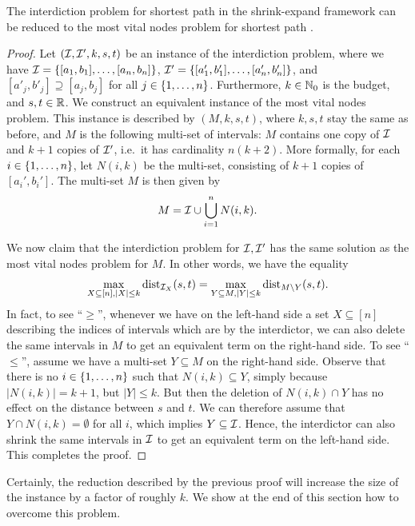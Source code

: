 \begin{lemma}
\label{lemma:shortest_path_reduction}
The interdiction problem for shortest path in the shrink-expand framework can be reduced to the most vital nodes problem for shortest path .
\end{lemma}
\begin{proof} 
Let $(\mathcal{I}, \mathcal{I}', k, s,t)$ be an instance of the interdiction problem, where we have $\mathcal{I} = \{ [a_1, b_1], \ldots, [a_n, b_n] \}$, $\mathcal{I}' = \{ [a'_1, b'_1], \ldots, [a'_n, b'_n] \}$, and $[a'_j, b'_j] \supseteq [a_j, b_j]$ for all $j \in \{ 1, \ldots, n \}$. Furthermore, $k \in \mathbb{N}_0$ is the budget, and $s, t \in \mathbb{R}$. We construct an equivalent instance of the most vital nodes problem. This instance is described by $(M, k, s, t)$, where $k, s, t$ stay the same as before, and $M$ is the following multi-set of intervals: $M$ contains one copy of $\mathcal{I}$ and $k+1$ copies of $\mathcal{I}'$, i.e.\ it has cardinality $n(k+2)$. More formally, for each $i \in \{ 1, \ldots, n \}$, let $N(i, k)$ be the multi-set, consisting of $k+1$ copies of $[a_i', b_i']$. The multi-set $M$ is then given by
\[M = \mathcal{I} \cup \bigcup_{i=1}^n N(i, k). \]

We now claim that the interdiction problem for $\mathcal{I}, \mathcal{I}'$ has the same solution as the most vital nodes problem for $M$. In other words, we have the equality
\[\max_{X \subseteq [n], |X| \leq k} \operatorname{\text{dist}}_{\mathcal{I}_X}(s, t) = \max_{Y \subseteq M, |Y| \leq k} \operatorname{\text{dist}}_{M \setminus Y}(s, t). \]
In fact, to see \enquote{$\geq$}, whenever we have on the left-hand side a set $X \subseteq [n]$ describing the indices of intervals which are  by the interdictor, 
we can also delete the same intervals in $M$ to get an equivalent term on the right-hand side. 
To see \enquote{$\leq$}, assume we have a multi-set $Y \subseteq M$ on the right-hand side. 
Observe that there is no $i \in \{ 1, \ldots, n \}$ such that $N(i, k) \subseteq Y$, simply because $|N(i, k)| = k+1$, 
but $|Y| \leq k$. But %
then the deletion of $N(i, k) \cap Y$ has no effect on the distance between $s$ and $t$. 
We can therefore assume that $Y \cap N(i,k) = \emptyset$ for all $i$, which implies $Y \subseteq \mathcal{I}$. 
Hence, the interdictor can also shrink the same intervals in $\mathcal{I}$ to get an equivalent term on the left-hand side. This completes the proof.
\end{proof}

Certainly, the reduction described by the previous proof will increase the size of the instance by a factor of roughly $k$. We show at the end of this section how to overcome this problem.

